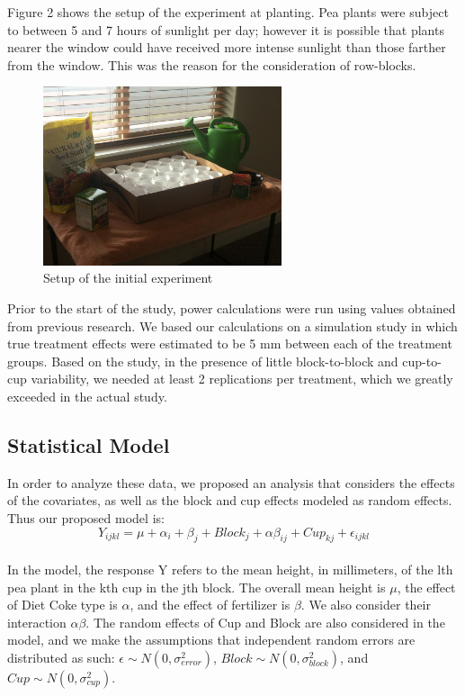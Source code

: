 \documentclass[1p,12pt]{elsarticle}\usepackage[]{graphicx}\usepackage[]{color}
\begin{document}
Figure 2 shows the setup of the experiment at planting. Pea plants were subject to between 5 and 7 hours of sunlight per day; however it is possible that plants nearer the window could have received more intense sunlight than those farther from the window. This was the reason for the consideration of row-blocks. 

 \begin{figure}[h!]
 	\caption{Setup of the initial experiment}
 	\centering
	\includegraphics[width = 7cm]{figure/setup.JPG}
\end{figure}

Prior to the start of the study, power calculations were run using values obtained from previous research.  We based our calculations on a simulation study in which true treatment effects were estimated to be 5 mm between each of the treatment groups. Based on the study, in the presence of little block-to-block and cup-to-cup variability, we needed at least 2 replications per treatment, which we greatly exceeded in the actual study. 


\subsection{Statistical Model}
In order to analyze these data, we proposed an analysis that considers the effects of the covariates, as well as the block and cup effects modeled as random effects. Thus our proposed model is: 
\\
\begin{equation}
Y_{ijkl} = \mu + \alpha_i + \beta_j + Block_j + \alpha\beta_{ij}+ Cup_{kj} + \epsilon_{ijkl}
\end{equation}
\\
In the model, the response Y refers to the mean height, in millimeters, of the lth pea plant in the kth cup in the jth block. The overall mean height is $\mu$, the effect of Diet Coke type is $\alpha$, and the effect of fertilizer is $\beta$. We also consider their interaction $\alpha\beta$. The random effects of Cup and Block are also considered in the model, and we make the assumptions that independent random errors are distributed as such: $\epsilon \sim N(0,\sigma^2_{error})$, $Block \sim N(0,\sigma^2_{block})$, and $Cup \sim N(0,\sigma^2_{cup})$. 
\end{document}
